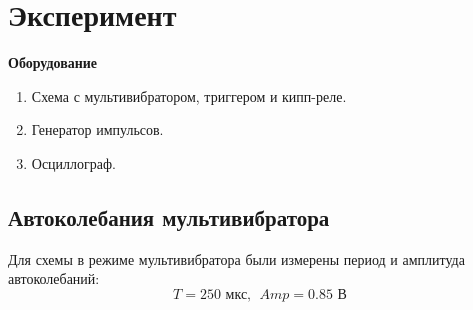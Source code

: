 
\usepackage{mwe}



\def\labauthors{Виноградов И.Д., Шиков А.П.}
\def\labgroup{430}
\def\labnumber{2}
\def\labtheme{Разрывные колебания}


\newpage
\section*{Эксперимент}
\textbf{Оборудование}
\begin{enumerate}
	\item Схема с мультивибратором, триггером и кипп-реле.
	\item Генератор импульсов.
	\item Осциллограф.
\end{enumerate}

\subsection*{Автоколебания мультивибратора}

Для схемы в режиме мультивибратора были измерены период и амплитуда автоколебаний:
$$ T = 250 \text{ мкс},~~ Amp = 0.85 \text{ В} $$

